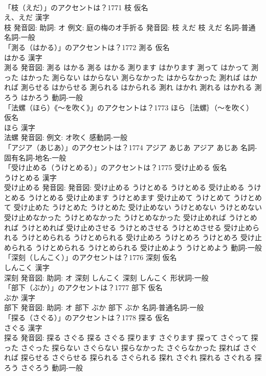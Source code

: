 \documentclass[8pt]{extreport}
\begin{document}
\begin{CJK}{UTF8}{min}
\\	「枝（えだ）」のアクセントは？1771	枝 仮名　
\\	え、えだ 漢字　
\\	枝 発音図: 助詞: オ 例文: 庭の梅のオ手折る 発音図:	枝 えだ		枝 えだ				名詞-普通名詞-一般 
\\	「測る（はかる）」のアクセントは？1772	測る 仮名　
\\	はかる 漢字　
\\	測る 発音図:	測る はかる		測る はかる 測ります はかります 測って はかって 測った はかった 測らない はからない 測らなかった はからなかった 測れば はかれば 測らせる はからせる 測られる はかられる 測れ はかれ 測れる はかれる 測ろう はかろう				動詞-一般 
\\	「法螺（ほら）《〜を吹く》」のアクセントは？1773	ほら｛法螺｝（〜を吹く） 仮名　
\\	ほら 漢字　
\\	法螺 発音図: 例文: オ吹く							感動詞-一般 
\\	「アジア（あじあ）」のアクセントは？1774		アジア あじあ		アジア あじあ				名詞-固有名詞-地名-一般 
\\	「受け止める（うけとめる）」のアクセントは？1775	受け止める 仮名　
\\	うけとめる 漢字　
\\	受け止める 発音図: 発音図:	受け止める うけとめる うけとめる		受け止める うけとめる うけとめる 受け止めます うけとめます 受け止めて うけとめて うけとめて 受け止めた うけとめた うけとめた 受け止めない うけとめない うけとめない 受け止めなかった うけとめなかった うけとめなかった 受け止めれば うけとめれば うけとめれば 受け止めさせる うけとめさせる うけとめさせる 受け止められる うけとめられる うけとめられる 受け止めろ うけとめろ うけとめろ 受け止められる うけとめられる うけとめられる 受け止めよう うけとめよう				動詞-一般 
\\	「深刻（しんこく）」のアクセントは？1776	深刻 仮名　
\\	しんこく 漢字　
\\	深刻 発音図: 助詞: オ	深刻 しんこく		深刻 しんこく				形状詞-一般 
\\	「部下（ぶか）」のアクセントは？1777	部下 仮名　
\\	ぶか 漢字　
\\	部下 発音図: 助詞: オ	部下 ぶか		部下 ぶか				名詞-普通名詞-一般 
\\	「探る（さぐる）」のアクセントは？1778	探る 仮名　
\\	さぐる 漢字　
\\	探る 発音図:	探る さぐる		探る さぐる 探ります さぐります 探って さぐって 探った さぐった 探らない さぐらない 探らなかった さぐらなかった 探れば さぐれば 探らせる さぐらせる 探られる さぐられる 探れ さぐれ 探れる さぐれる 探ろう さぐろう				動詞-一般 

\end{CJK}
\end{document}
